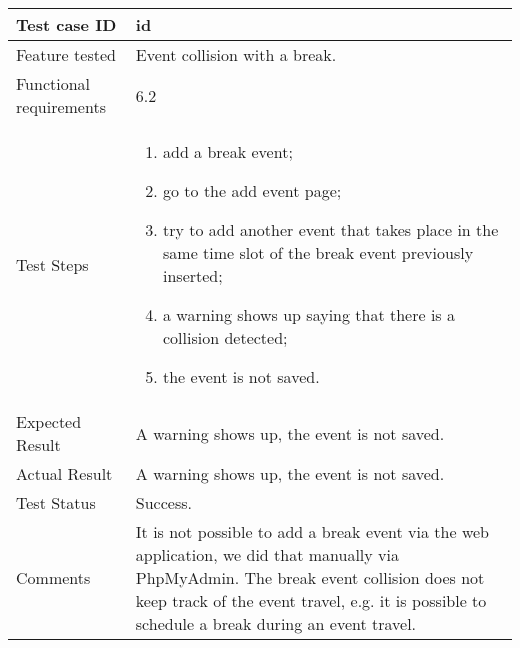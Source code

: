 \begin{table}[H]
	\begin{center}
		\begin{tabular}{ | p{} | p{} | }
		\hline
		Test case ID & id\\
		\hline
		Feature tested & Event collision with a break.\\
    	\hline
		Functional requirements & 6.2  \\
		\hline
		Test Steps & 
			\begin{enumerate}
				\item add a break event;
				\item go to the add event page;
				\item try to add another event that takes place in the same time slot of the break event previously inserted;
				\item a warning shows up saying that there is a collision detected;
				\item the event is not saved.
			\end{enumerate} \\
		\hline
		Expected Result & A warning shows up, the event is not saved.\\
		\hline
		Actual Result & A warning shows up, the event is not saved.\\ 
		\hline
		Test Status & \color{ForestGreen}Success.\\ 
		\hline
		Comments & It is not possible to add a break event via the web application, we did that manually via PhpMyAdmin. The break event collision does not keep track of the event travel, e.g. it is possible to schedule a break during an event travel. \\
		\hline
		
		\end{tabular}
	\end{center}
\end{table}

